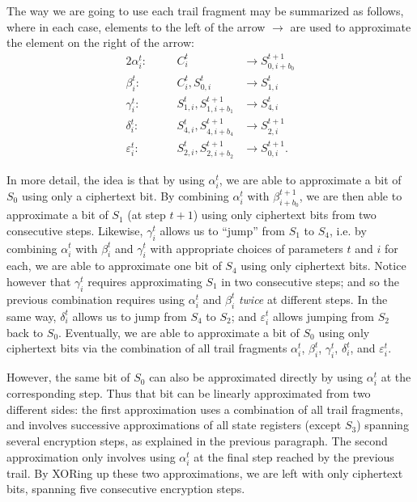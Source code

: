 The way we are going to use each trail fragment may be summarized as follows, where in each case, elements to the left of the arrow $\to$ are used to approximate the element on the right of the arrow:
\begin{alignat*}{2}
\alpha^t_i:\quad&& C^t_i &\to S^{t+1}_{0,i+b_0} \\
\beta^t_i:\quad&& C^t_i, S^t_{0,i} &\to S^t_{1,i} \\
\gamma^t_i:\quad&& S^t_{1,i}, S^{t+1}_{1,i+b_1} &\to S^t_{4,i} \\
\delta^t_i:\quad&& S^t_{4,i}, S^{t+1}_{4,i+b_4} &\to S^{t+1}_{2,i} \\
\varepsilon^t_i:\quad&& S^t_{2,i}, S^{t+1}_{2,i+b_2} &\to S^{t+1}_{0,i}.
\end{alignat*}

In more detail, the idea is that by using $\alpha^t_i$, we are able to approximate a bit of $S_0$ using only a ciphertext bit. By combining $\alpha^t_i$ with $\beta^{t+1}_{i+b_0}$, we are then able to approximate a bit of $S_1$ (at step $t+1$) using only ciphertext bits from two consecutive steps. Likewise, $\gamma^t_i$ allows us to ``jump'' from $S_1$ to $S_4$, i.e. by combining $\alpha^t_i$ with $\beta^t_i$ and $\gamma^t_i$ with appropriate choices of parameters $t$ and $i$ for each, we are able to approximate one bit of $S_4$ using only ciphertext bits. Notice however that $\gamma^t_i$ requires approximating $S_1$ in two consecutive steps; and so the previous combination requires using $\alpha^t_i$ and $\beta^t_i$ \emph{twice} at different steps. In the same way, $\delta^t_i$ allows us to jump from $S_4$ to $S_2$; and $\varepsilon^t_i$ allows jumping from $S_2$ back to $S_0$. Eventually, we are able to approximate a bit of $S_0$ using only ciphertext bits via the combination of all trail fragments $\alpha^t_i$, $\beta^t_i$, $\gamma^t_i$, $\delta^t_i$, and $\varepsilon^t_i$.

However, the same bit of $S_0$ can also be approximated directly by using $\alpha^t_i$ at the corresponding step. Thus that bit can be linearly approximated from two different sides: the first approximation uses a combination of all trail fragments, and involves successive approximations of all state registers (except $S_3$) spanning several encryption steps, as explained in the previous paragraph. The second approximation only involves using $\alpha^t_i$ at the final step reached by the previous trail. By XORing up these two approximations, we are left with only ciphertext bits, spanning five consecutive encryption steps.

